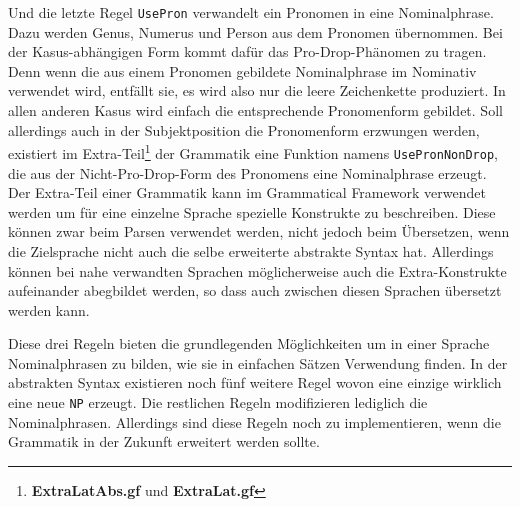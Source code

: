 Und die letzte Regel \texttt{UsePron} verwandelt ein Pronomen in eine Nominalphrase. Dazu werden Genus, Numerus und Person aus dem Pronomen übernommen. Bei der Kasus-abhängigen Form kommt dafür das Pro-Drop-Phänomen zu tragen. Denn wenn die aus einem Pronomen gebildete Nominalphrase im Nominativ verwendet wird, entfällt sie, es wird also nur die leere Zeichenkette produziert. In allen anderen Kasus wird einfach die entsprechende Pronomenform gebildet. 
Soll allerdings auch in der Subjektposition die Pronomenform erzwungen werden, existiert im Extra-Teil\footnote{\textbf{ExtraLatAbs.gf} und \textbf{ExtraLat.gf}} der Grammatik eine Funktion namens \texttt{UsePronNonDrop}, die aus der Nicht-Pro-Drop-Form des Pronomens eine Nominalphrase erzeugt. Der Extra-Teil einer Grammatik kann im Grammatical Framework verwendet werden um für eine einzelne Sprache spezielle Konstrukte zu beschreiben. Diese können zwar beim Parsen verwendet werden, nicht jedoch beim Übersetzen, wenn die Zielsprache nicht auch die selbe erweiterte abstrakte Syntax hat. Allerdings können bei nahe verwandten Sprachen möglicherweise auch die Extra-Konstrukte aufeinander abegbildet werden, so dass auch zwischen diesen Sprachen übersetzt werden kann.\par
Diese drei Regeln bieten die grundlegenden Möglichkeiten um in einer Sprache Nominalphrasen zu bilden, wie sie in einfachen Sätzen Verwendung finden. In der abstrakten Syntax existieren noch fünf weitere Regel wovon eine einzige wirklich eine neue \texttt{NP} erzeugt. Die restlichen Regeln modifizieren lediglich die Nominalphrasen. Allerdings sind diese Regeln noch zu implementieren, wenn die Grammatik in der Zukunft erweitert werden sollte.
